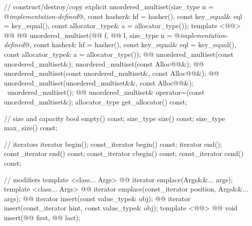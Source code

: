 \documentclass[american,twoside]{book}
\begin{document}
\begin{codeblock}
{{    // construct/destroy/copy
    explicit unordered_multiset(size_type n = @\textit{implementation-defined}@,
                                const hasher& hf = hasher(),
                                const key_equal& eql = key_equal(),
                                const allocator_type& a = allocator_type());
    template <@@>
      @@
            @@
      unordered_multiset(@@ f, @@ l,
                         size_type n = @\textit{implementation-defined}@,
                         const hasher& hf = hasher(),
                         const key_equal& eql = key_equal(),
                         const allocator_type& a = allocator_type());
    @@ 
      unordered_multiset(const unordered_multiset&);
    unordered_multiset(const Alloc@@&);
    @@ 
      unordered_multiset(const unordered_multiset&, const Alloc@@&);
    @@
      unordered_multiset(unordered_multiset&&, const Alloc@@&);
    ~unordered_multiset();
    @@
      unordered_multiset& operator=(const unordered_multiset&);
    allocator_type get_allocator() const;

    // size and capacity
    bool empty() const;
    size_type size() const;
    size_type max_size() const;

    // iterators
    iterator       begin();
    const_iterator begin() const;
    iterator       end();
    const_iterator end() const;
    const_iterator cbegin() const;
    const_iterator cend() const;

    // modifiers
    template <class... Args> 
      @@
      iterator emplace(Args&&... args);
    template <class... Args> 
      @@
      iterator emplace(const_iterator position, Args&&... args);
    @@ 
      iterator insert(const value_type& obj);
    @@ 
      iterator insert(const_iterator hint, const value_type& obj);
    template <@@> 
      @@
      void insert(@@ first, @@ last);

}}
\end{codeblock}
\end{document}

